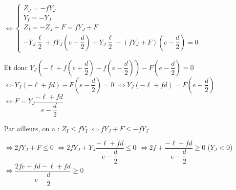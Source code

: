 \documentclass[10pt,fleqn]{article} %
\begin{document}
\begin{multicols}{2}
\begin{corrige}
$
\Leftrightarrow 
\left\{
\begin{array}{l}
Z_J =  -fY_J \\
Y_I =- Y_J  \\
Z_I = -Z_J +F  = fY_J +F \\ 
-Y_J \dfrac{\ell}{2}+fY_J \left(e+\dfrac{d}{2}\right) 
-Y_J \dfrac{\ell}{2}-\left(  fY_J +F\right) \left(e-\dfrac{d}{2}\right) = 0
\end{array}
\right.$

Et donc $Y_J\left(- {\ell}+f \left(e+\dfrac{d}{2}\right) 
- f  \left(e-\dfrac{d}{2}\right)\right) 
-F \left(e-\dfrac{d}{2}\right)= 0$
$\Leftrightarrow Y_J\left(- {\ell}+f d\right) -F \left(e-\dfrac{d}{2}\right)= 0$
$\Leftrightarrow Y_J\left(- {\ell}+f d\right) =F \left(e-\dfrac{d}{2}\right)$
$\Leftrightarrow F = Y_J\dfrac{- {\ell}+f d}{e-\dfrac{d}{2}}$

Par ailleurs, on a : 
$Z_I\leq fY_I$ 
$\Leftrightarrow   fY_J +F \leq -f  Y_J$

$\Leftrightarrow   2fY_J +F \leq 0$
$\Leftrightarrow   2fY_J +Y_J\dfrac{- {\ell}+f d}{e-\dfrac{d}{2}} \leq 0$
$\Leftrightarrow   2f +\dfrac{- {\ell}+f d}{e-\dfrac{d}{2}} \geq 0$ ($Y_J<0$)
$\Leftrightarrow   \dfrac{2fe-fd- {\ell}+f d}{e-\dfrac{d}{2}} \geq 0$ 
\end{corrige}



\end{multicols}
\end{document}
